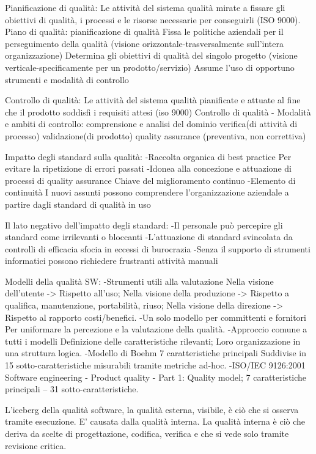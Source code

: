 \documentclass{report}
\begin{document}
Pianificazione di qualità: Le attività del sistema qualità mirate a fissare gli obiettivi di qualità, i processi e le risorse necessarie per conseguirli (ISO 9000).
Piano di qualità: pianificazione di qualità
Fissa le politiche aziendali per il perseguimento della qualità (visione orizzontale-trasversalmente sull'intera organizzazione)
Determina gli obiettivi di qualità del singolo progetto (visione verticale-specificamente per un prodotto/servizio)
Assume l'uso di opportuno strumenti e modalità di controllo

Controllo di qualità: Le attività del sistema qualità pianificate e attuate al fine che il prodotto soddisfi i requisiti attesi (iso 9000)
Controllo di qualità - Modalità e ambiti di controllo:
comprensione e analisi del dominio
verifica(di attività di  processo)
validazione(di prodotto)
quality assurance (preventiva, non correttiva)

Impatto degli standard sulla qualità:
-Raccolta organica di best practice
 Per evitare la ripetizione di errori passati
-Idonea alla concezione e attuazione di processi di quality assurance
 Chiave del miglioramento continuo
-Elemento di continuità
 I nuovi assunti possono comprendere l’organizzazione aziendale a partire dagli standard di qualità in uso

Il lato negativo dell'impatto degli standard:
-Il personale può percepire gli standard come irrilevanti o bloccanti
-L’attuazione di standard svincolata da controlli di efficacia sfocia in eccessi di burocrazia
-Senza il supporto di strumenti informatici possono richiedere frustranti attività manuali

Modelli della qualità SW:
-Strumenti utili alla valutazione
 Nella visione dell’utente -> Rispetto all’uso;
 Nella visione della produzione -> Rispetto a qualifica, manutenzione, portabilità, riuso;
 Nella visione della direzione -> Rispetto al rapporto costi/benefici.
-Un solo modello per committenti e fornitori
 Per uniformare la percezione e la valutazione della qualità.
-Approccio comune a tutti i modelli
 Definizione delle caratteristiche rilevanti;
 Loro organizzazione in una struttura logica.
-Modello di Boehm
 7 caratteristiche principali Suddivise in 15 sotto-caratteristiche misurabili tramite metriche ad-hoc.
-ISO/IEC 9126:2001
 Software engineering - Product quality - Part 1: Quality model;
 7 caratteristiche principali – 31 sotto-caratteristiche.

L'iceberg della qualità software, la qualità esterna, visibile, è ciò che si osserva tramite esecuzione. E' causata dalla qualità interna. La qualità interna è ciò che deriva da scelte di progettazione, codifica, verifica e che si vede solo tramite revisione critica.
\end{document}
